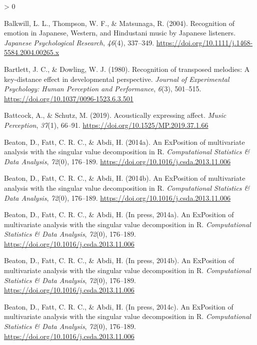 \documentclass[
  english,
  man]{apa6}
\newlength{\cslhangindent}
\newenvironment{CSLReferences}[2] %
 {%
  \setlength{\parindent}{0pt}
  \ifodd #1 \everypar{\setlength{\hangindent}{\cslhangindent}}\ignorespaces\fi
  \ifnum #2 > 0
  \setlength{\parskip}{#2\baselineskip}
  \fi
 }%
 {}
\begin{document}
\begin{CSLReferences}{1}{0}
\leavevmode\hypertarget{ref-Balkwill2004}{}%
Balkwill, L. L., Thompson, W. F., \& Matsunaga, R. (2004). {Recognition of emotion in Japanese, Western, and Hindustani music by Japanese listeners}. \emph{Japanese Psychological Research}, \emph{46}(4), 337--349. \url{https://doi.org/10.1111/j.1468-5584.2004.00265.x}

\leavevmode\hypertarget{ref-Bartlett1980a}{}%
Bartlett, J. C., \& Dowling, W. J. (1980). {Recognition of transposed melodies: A key-distance effect in developmental perspective}. \emph{Journal of Experimental Psychology: Human Perception and Performance}, \emph{6}(3), 501--515. \url{https://doi.org/10.1037/0096-1523.6.3.501}

\leavevmode\hypertarget{ref-Battcock2019}{}%
Battcock, A., \& Schutz, M. (2019). {Acoustically expressing affect}. \emph{Music Perception}, \emph{37}(1), 66--91. \url{https://doi.org/10.1525/MP.2019.37.1.66}

\leavevmode\hypertarget{ref-R-ExPosition}{}%
Beaton, D., Fatt, C. R. C., \& Abdi, H. (2014a). An {ExPosition} of multivariate analysis with the singular value decomposition in {R}. \emph{Computational Statistics \& Data Analysis}, \emph{72}(0), 176--189. \url{https://doi.org/10.1016/j.csda.2013.11.006}

\leavevmode\hypertarget{ref-R-prettyGraphs}{}%
Beaton, D., Fatt, C. R. C., \& Abdi, H. (2014b). An {ExPosition} of multivariate analysis with the singular value decomposition in {R}. \emph{Computational Statistics \& Data Analysis}, \emph{72}(0), 176--189. \url{https://doi.org/10.1016/j.csda.2013.11.006}

\leavevmode\hypertarget{ref-R-InPosition}{}%
Beaton, D., Fatt, C. R. C., \& Abdi, H. (In press, 2014a). An {ExPosition} of multivariate analysis with the singular value decomposition in {R}. \emph{Computational Statistics \& Data Analysis}, \emph{72}(0), 176--189. \url{https://doi.org/10.1016/j.csda.2013.11.006}

\leavevmode\hypertarget{ref-R-TExPosition}{}%
Beaton, D., Fatt, C. R. C., \& Abdi, H. (In press, 2014b). An {ExPosition} of multivariate analysis with the singular value decomposition in {R}. \emph{Computational Statistics \& Data Analysis}, \emph{72}(0), 176--189. \url{https://doi.org/10.1016/j.csda.2013.11.006}

\leavevmode\hypertarget{ref-R-TInPosition}{}%
Beaton, D., Fatt, C. R. C., \& Abdi, H. (In press, 2014c). An {ExPosition} of multivariate analysis with the singular value decomposition in {R}. \emph{Computational Statistics \& Data Analysis}, \emph{72}(0), 176--189. \url{https://doi.org/10.1016/j.csda.2013.11.006}


\end{CSLReferences}
\end{document}
